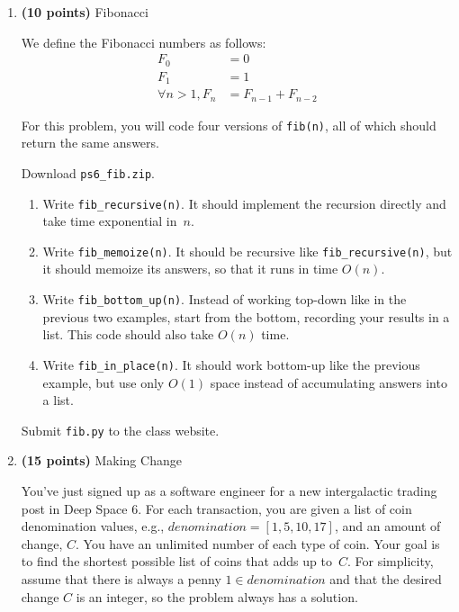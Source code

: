 \documentclass[12pt,twoside]{article}
\begin{document}
\begin{enumerate}

\item {\bf (10 points)} Fibonacci
  
  We define the Fibonacci numbers as follows:
  \begin{align*}
    F_0 &= 0\\
    F_1 &= 1\\
    \forall n > 1, F_n &= F_{n-1} + F_{n-2}
  \end{align*}

  For this problem, you will code four versions of \verb|fib(n)|, all
  of which should return the same answers.

  Download \verb|ps6_fib.zip|.

  \begin{enumerate}
  \item Write \verb|fib_recursive(n)|. It should implement the
    recursion directly and take time exponential in~$n$.
  \item Write \verb|fib_memoize(n)|. It should be recursive like
    \verb|fib_recursive(n)|, but it should memoize its answers, so
    that it runs in time $O(n)$.
  \item Write \verb|fib_bottom_up(n)|. Instead of working top-down
    like in the previous two examples, start from the bottom,
    recording your results in a list. This code should also take
    $O(n)$ time.
  \item Write \verb|fib_in_place(n)|.  It should work bottom-up like
    the previous example, but use only $O(1)$ space instead of
    accumulating answers into a list.
  \end{enumerate}

  Submit \verb|fib.py| to the class website.

\newpage

\item {\bf (15 points)} Making Change

  You've just signed up as a software engineer for a new intergalactic
  trading post in Deep Space 6.  For each transaction, you are given a
  list of coin denomination values,
  e.g., $\mathit{denomination} = [1, 5, 10, 17]$, and an
  amount of change, $C$. You have an unlimited number of each type of
  coin. Your goal is to find the shortest possible list of coins that
  adds up to~$C$. For simplicity, assume that there is always a penny
  $1 \in \mathit{denomination}$ and that the desired change $C$ is an integer,
  so the problem always has a solution.


\end{enumerate}
\end{document}
